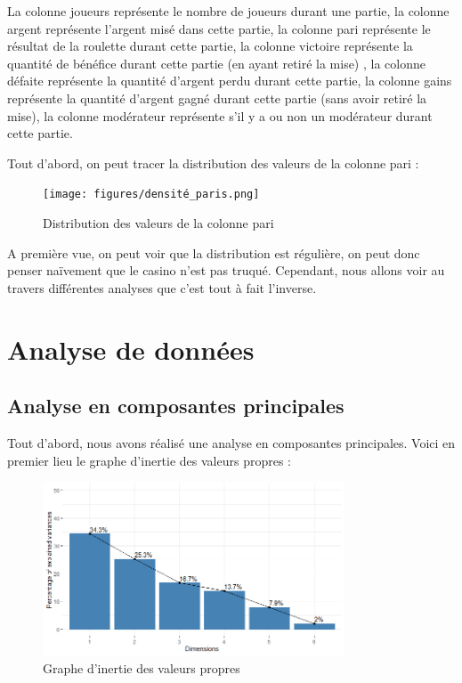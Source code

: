\documentclass[a4paper, 12pt]{article}
\theoremstyle{exo}
\begin{document}
\noindent La colonne joueurs représente le nombre de joueurs durant une partie, la colonne argent représente l'argent misé dans cette partie, la colonne pari représente le résultat de la roulette durant cette partie, la colonne victoire représente la quantité de bénéfice durant cette partie (en ayant retiré la mise) , la colonne défaite représente la quantité d'argent perdu durant cette partie, la colonne gains représente la quantité d'argent gagné durant cette partie (sans avoir retiré la mise), la colonne modérateur représente s'il y a ou non un modérateur durant cette partie.\\

\newpage

Tout d'abord, on peut tracer la distribution des valeurs de la colonne pari :

\begin{figure}[H]
\centering
\texttt{[image: figures/densité\_paris.png]}
\caption{Distribution des valeurs de la colonne pari}
\end{figure}

\noindent A première vue, on peut voir que la distribution est régulière, on peut donc penser naïvement que le casino n'est pas truqué. Cependant, nous allons voir au travers différentes analyses que c'est tout à fait l'inverse.

\newpage

\section{Analyse de données}
\subsection{Analyse en composantes principales}

Tout d'abord, nous avons réalisé une analyse en composantes principales. Voici en premier lieu le graphe d'inertie des valeurs propres :

\begin{figure}[H]
\centering
\includegraphics[width=0.8\textwidth]{figures/Valeurs_propres.png}
\caption{Graphe d'inertie des valeurs propres}
\end{figure}
\end{document}
